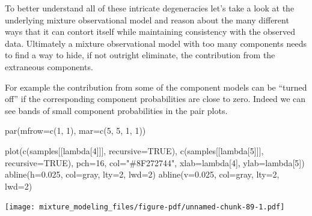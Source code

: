 \documentclass[
  letterpaper,
  DIV=11,
  numbers=noendperiod]{scrartcl}
\newenvironment{Shaded}{\begin{snugshade}}{\end{snugshade}}
\newcommand{\AttributeTok}[1]{\textcolor[rgb]{0.40,0.45,0.13}{#1}}
\newcommand{\ConstantTok}[1]{\textcolor[rgb]{0.56,0.35,0.01}{#1}}
\newcommand{\DecValTok}[1]{\textcolor[rgb]{0.68,0.00,0.00}{#1}}
\newcommand{\FloatTok}[1]{\textcolor[rgb]{0.68,0.00,0.00}{#1}}
\newcommand{\FunctionTok}[1]{\textcolor[rgb]{0.28,0.35,0.67}{#1}}
\newcommand{\NormalTok}[1]{\textcolor[rgb]{0.00,0.23,0.31}{#1}}
\newcommand{\StringTok}[1]{\textcolor[rgb]{0.13,0.47,0.30}{#1}}
\begin{document}
To better understand all of these intricate degeneracies let's take a
look at the underlying mixture observational model and reason about the
many different ways that it can contort itself while maintaining
consistency with the observed data. Ultimately a mixture observational
model with too many components needs to find a way to hide, if not
outright eliminate, the contribution from the extraneous components.

For example the contribution from some of the component models can be
``turned off'' if the corresponding component probabilities are close to
zero. Indeed we can see bands of small component probabilities in the
pair plots.

\begin{Shaded}
\begin{Highlighting}[]
\FunctionTok{par}\NormalTok{(}\AttributeTok{mfrow=}\FunctionTok{c}\NormalTok{(}\DecValTok{1}\NormalTok{, }\DecValTok{1}\NormalTok{), }\AttributeTok{mar=}\FunctionTok{c}\NormalTok{(}\DecValTok{5}\NormalTok{, }\DecValTok{5}\NormalTok{, }\DecValTok{1}\NormalTok{, }\DecValTok{1}\NormalTok{))}

\FunctionTok{plot}\NormalTok{(}\FunctionTok{c}\NormalTok{(samples[[}\StringTok{\textquotesingle{}lambda[4]\textquotesingle{}}\NormalTok{]], }\AttributeTok{recursive=}\ConstantTok{TRUE}\NormalTok{),}
     \FunctionTok{c}\NormalTok{(samples[[}\StringTok{\textquotesingle{}lambda[5]\textquotesingle{}}\NormalTok{]], }\AttributeTok{recursive=}\ConstantTok{TRUE}\NormalTok{),}
     \AttributeTok{pch=}\DecValTok{16}\NormalTok{, }\AttributeTok{col=}\StringTok{"\#8F272744"}\NormalTok{,}
     \AttributeTok{xlab=}\StringTok{\textquotesingle{}lambda[4]\textquotesingle{}}\NormalTok{, }\AttributeTok{ylab=}\StringTok{\textquotesingle{}lambda[5]\textquotesingle{}}\NormalTok{)}
\FunctionTok{abline}\NormalTok{(}\AttributeTok{h=}\FloatTok{0.025}\NormalTok{, }\AttributeTok{col=}\StringTok{\textquotesingle{}gray\textquotesingle{}}\NormalTok{, }\AttributeTok{lty=}\DecValTok{2}\NormalTok{, }\AttributeTok{lwd=}\DecValTok{2}\NormalTok{)}
\FunctionTok{abline}\NormalTok{(}\AttributeTok{v=}\FloatTok{0.025}\NormalTok{, }\AttributeTok{col=}\StringTok{\textquotesingle{}gray\textquotesingle{}}\NormalTok{, }\AttributeTok{lty=}\DecValTok{2}\NormalTok{, }\AttributeTok{lwd=}\DecValTok{2}\NormalTok{)}
\end{Highlighting}
\end{Shaded}

\texttt{[image: mixture\_modeling\_files/figure-pdf/unnamed-chunk-89-1.pdf]}
\end{document}
